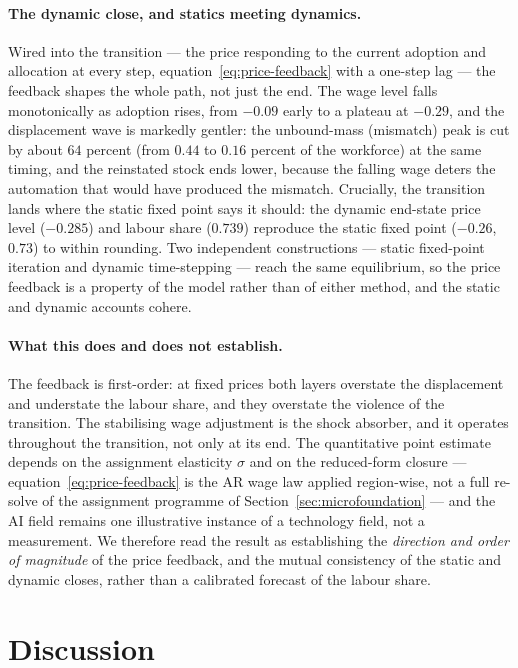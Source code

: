 \documentclass[12pt, a4paper]{article}
\begin{document}
\paragraph{The dynamic close, and statics meeting dynamics.}
Wired into the transition --- the price responding to the current adoption and
allocation at every step, equation~\eqref{eq:price-feedback} with a one-step lag
--- the feedback shapes the whole path, not just the end. The wage level falls
monotonically as adoption rises, from $-0.09$ early to a plateau at $-0.29$, and
the displacement wave is markedly gentler: the unbound-mass (mismatch) peak is
cut by about $64$ percent (from $0.44$ to $0.16$ percent of the workforce) at the
same timing, and the reinstated stock ends lower, because the falling wage deters
the automation that would have produced the mismatch. Crucially, the transition
lands where the static fixed point says it should: the dynamic end-state price
level ($-0.285$) and labour share ($0.739$) reproduce the static fixed point
($-0.26$, $0.73$) to within rounding. Two independent constructions --- static
fixed-point iteration and dynamic time-stepping --- reach the same equilibrium,
so the price feedback is a property of the model rather than of either method,
and the static and dynamic accounts cohere.

\paragraph{What this does and does not establish.}
The feedback is first-order: at fixed prices both layers overstate the
displacement and understate the labour share, and they overstate the violence of
the transition. The stabilising wage adjustment is the shock absorber, and it
operates throughout the transition, not only at its end. The quantitative point
estimate depends on the assignment elasticity $\sigma$ and on the reduced-form
closure --- equation~\eqref{eq:price-feedback} is the AR wage law applied
region-wise, not a full re-solve of the assignment programme of
Section~\ref{sec:microfoundation} --- and the AI field remains one illustrative
instance of a technology field, not a measurement. We therefore read the result
as establishing the \emph{direction and order of magnitude} of the price
feedback, and the mutual consistency of the static and dynamic closes, rather
than a calibrated forecast of the labour share.

\section{Discussion}
\label{sec:discussion}
\end{document}
